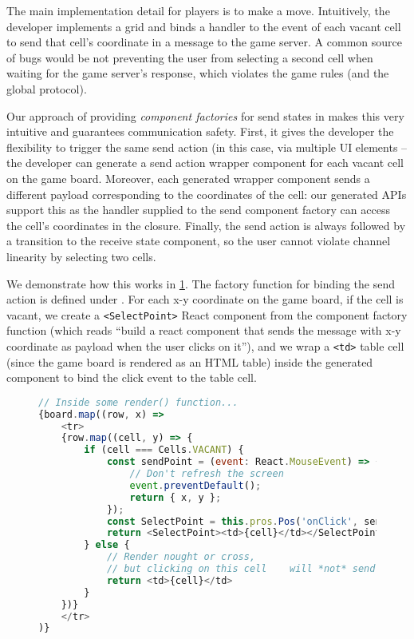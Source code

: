 The main implementation detail for players
is to make a move. 
Intuitively, the developer implements a grid and binds a handler
to the  event of each vacant cell to send that cell's coordinate 
in a  message to the game server.
A common source of bugs would be not preventing the user from selecting
a second cell when waiting for the game server's response,
which violates the game rules (and the global protocol).

Our approach of providing \textit{component factories} for send states
in \reactcodegen makes this very intuitive and guarantees communication safety.
First, it gives the developer the flexibility to trigger
the same send action (in this case,  via multiple
UI elements -- the developer can generate a send action wrapper component 
for each vacant cell on the game board.
Moreover, each generated wrapper component sends a different payload
corresponding to the coordinates of the cell:
our generated APIs support this as the handler supplied
to the send component factory can access the cell's coordinates in the closure.
Finally, the send action is always followed by a transition to the receive
state component, so the user cannot violate channel linearity by selecting
two cells.

We demonstrate how this works in \cref{lst:gamesendfactory}.
The factory function for binding the  send action
is defined under .
For each x-y coordinate on the game board, if the cell is vacant,
we create a \texttt{<SelectPoint>} React component from the
component factory function (which reads ``build a react
component that sends the  message with x-y coordinate
as payload when the user clicks on it''), and we wrap
a \texttt{<td>} table cell (since the game board is rendered as an
HTML table) inside the generated component to bind the click event
to the table cell.

\begin{figure}[!h]
\begin{lstlisting}[language=javascript,tabsize=2]
// Inside some render() function...
{board.map((row, x) =>
	<tr>
	{row.map((cell, y) => {
		if (cell === Cells.VACANT) {
			const sendPoint = (event: React.MouseEvent) => {
				// Don't refresh the screen
				event.preventDefault();
				return { x, y };
			});
			const SelectPoint = this.pros.Pos('onClick', sendPoint);
			return <SelectPoint><td>{cell}</td></SelectPoint>
		} else {
			// Render nought or cross,
			// but clicking on this cell 	will *not* send anything
			return <td>{cell}</td>
		}		
	})}
	</tr>
)}
\end{lstlisting}
\label{lst:gamesendfactory}
\end{figure}

